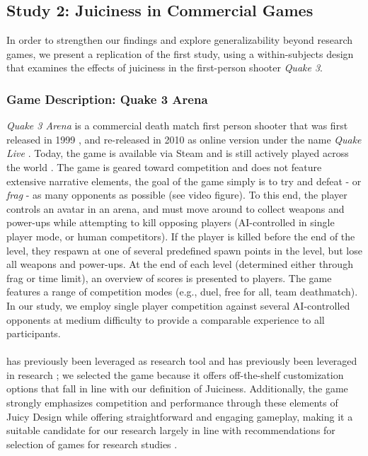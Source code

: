 \documentclass{sigchi}
\begin{document}
\subsection{Study 2: Juiciness in Commercial Games}
In order to strengthen our findings and explore generalizability beyond research games, we present a replication of the first study, using a within-subjects design that examines the effects of juiciness in the first-person shooter \textit{Quake 3}.

\subsubsection{Game Description: Quake 3 Arena}
\textit{Quake 3 Arena} is a commercial death match first person shooter that was first released in 1999 \cite{quake3arena:pc}, and re-released in 2010 as online version under the name \textit{Quake Live} \cite{quake3live:pc}. Today, the game is available via Steam and is still actively played across the world \cite{Quake3Stats}. The game is geared toward competition and does not feature extensive narrative elements, the goal of the game simply is to try and defeat - or \textit{frag} - as many opponents as possible (see video figure). To this end, the player controls an avatar in an arena, and must move around to collect weapons and power-ups while attempting to kill opposing players (AI-controlled in single player mode, or human competitors). If the player is killed before the end of the level, they respawn at one of several predefined spawn points in the level, but lose all weapons and power-ups. At the end of each level (determined either through frag or time limit), an overview of scores is presented to players. The game features a range of competition modes (e.g., duel, free for all, team deathmatch). In our study, we employ single player competition against several AI-controlled opponents at medium difficulty to provide a comparable experience to all participants.
\\\\
 has previously been leveraged as research tool and has previously been leveraged in research \cite{Bakaoukas2016}; we selected the game because it offers off-the-shelf customization options that fall in line with our definition of Juiciness. Additionally, the game strongly emphasizes competition and performance through these elements of Juicy Design while offering straightforward and engaging gameplay, making it a suitable candidate for our research largely in line with recommendations for selection of games for research studies \cite{Tyack2018}.
\end{document}
